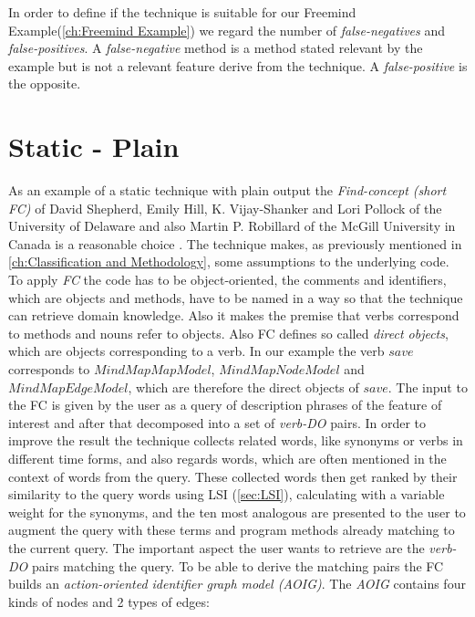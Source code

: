 In order to define if the technique is suitable for our Freemind Example(\autoref{ch:Freemind Example}) we regard the number of \textit{false-negatives} and \textit{false-positives}. A \textit{false-negative} method is a method stated relevant by the example but is not a relevant feature derive from the technique. A \textit{false-positive} is the opposite.

\section{Static - Plain}
\label{sec:find-concept}
As an example of a static technique with plain output the \emph{Find-concept (short FC)} of David Shepherd, Emily Hill, K. Vijay-Shanker and Lori Pollock of the University of Delaware and also Martin P. Robillard of the McGill University in Canada is a reasonable choice \cite{shepherd2007using}.
The technique makes, as previously mentioned in \autoref{ch:Classification and Methodology}, some assumptions to the underlying code. To apply \emph{FC} the code has to be object-oriented, the comments and identifiers, which are objects and methods, have to be named in a way so that the technique can retrieve domain knowledge. Also it makes the premise that verbs correspond to methods and nouns refer to objects. Also FC defines so called \textit{direct objects}, which are objects corresponding to a verb. In our example the verb $save$ corresponds to $MindMapMapModel$, $MindMapNodeModel$ and $MindMapEdgeModel$, which are therefore the direct objects of $save$.\newline
\emptyLine
The input to the FC is given by the user as a query of description phrases of the feature of interest and after that decomposed into a set of \textit{verb-DO} pairs. In order to improve the result the technique collects related words, like synonyms or verbs in different time forms, and also regards words, which are often mentioned in the context of words from the query. These collected words then get ranked by their similarity to the query words using LSI (\autoref{sec:LSI}), calculating with a variable weight for the synonyms, and the ten most analogous are presented to the user to augment the query with these terms and program methods already matching to the current query.\newline
\emptyLine
The important aspect the user wants to retrieve are the \textit{verb-DO} pairs matching the query. To be able to derive the matching pairs the FC builds an \textit{action-oriented identifier graph model (AOIG)}. The \textit{AOIG} contains four kinds of nodes and 2 types of edges:

